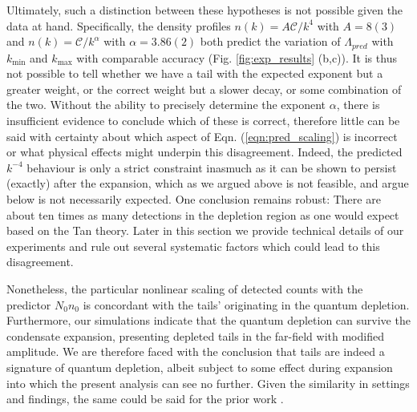 	Ultimately, such a distinction between these hypotheses is not possible given the data at hand. 
	Specifically, the density profiles $n(k)=A\mathcal{C}/k^4$ with $A=8(3)$ and $n(k)=\mathcal{C}/k^{\alpha}$ with $\alpha=3.86(2)$ both predict the variation of $\Lambda_{pred}$ with $k_\textrm{min}$ and $k_\textrm{max}$ with comparable accuracy (Fig. \ref{fig:exp_results} (b,c)).
	It is thus not possible to tell whether we have a tail with the expected exponent but a greater weight, or the correct weight but a slower decay, or some combination of the two.
	Without the ability to precisely determine the exponent $\alpha$, there is insufficient evidence to conclude which of these is correct, therefore little can be said with certainty about which aspect of Eqn. (\ref{eqn:pred_scaling}) is incorrect or what physical effects might underpin this disagreement.
	Indeed, the predicted $k^{-4}$ behaviour is only a strict constraint inasmuch as it can be shown to persist (exactly) after the expansion, which as we argued above is not feasible, and argue below is not necessarily expected.
	One conclusion remains robust: There are about ten times as many detections in the depletion region as one would expect based on the Tan theory. 
	Later in this section we provide technical details of our experiments and rule out several systematic factors which could lead to this disagreement.


	Nonetheless, the particular nonlinear scaling of detected counts with the predictor $N_0n_0$ is concordant with the tails' originating in the quantum depletion.
	Furthermore, our simulations indicate that the quantum depletion can survive the condensate expansion, presenting depleted tails in the far-field with modified amplitude. 
	We are therefore faced with the conclusion that tails are indeed a signature of quantum depletion, albeit subject to some effect during expansion into which the present analysis can see no further.
	Given the similarity in settings and findings, the same could be said for the prior work \cite{Chang16}.
	
